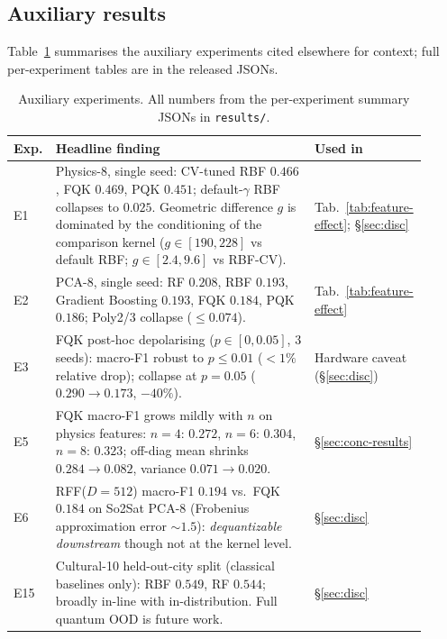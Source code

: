 \documentclass[pdflatex,sn-mathphys]{sn-jnl}
\theoremstyle{plain}
\theoremstyle{remark}
\theoremstyle{definition}
\begin{document}
\subsection{Auxiliary results}\label{sec:aux-results}\label{sec:rff}

Table~\ref{tab:aux} summarises the auxiliary experiments cited elsewhere for context; full per-experiment tables are in the released JSONs.

\begin{table}[htbp]
\caption{Auxiliary experiments.  All numbers from the per-experiment summary JSONs in \texttt{results/}.}
\label{tab:aux}
\begin{tabular}{p{0.08\linewidth}p{0.62\linewidth}p{0.21\linewidth}}
\toprule
Exp. & Headline finding & Used in \\
\midrule
E1  & Physics-8, single seed: CV-tuned RBF $0.466$, FQK $0.469$, PQK $0.451$; default-$\gamma$ RBF collapses to $0.025$.  Geometric difference $g$ is dominated by the conditioning of the comparison kernel ($g\in[190, 228]$ vs default RBF; $g\in[2.4, 9.6]$ vs RBF-CV). & Tab.~\ref{tab:feature-effect}; \S\ref{sec:disc} \\
E2  & PCA-8, single seed: RF $0.208$, RBF $0.193$, Gradient Boosting $0.193$, FQK $0.184$, PQK $0.186$; Poly2/3 collapse ($\le 0.074$). & Tab.~\ref{tab:feature-effect} \\
E3  & FQK post-hoc depolarising ($p\in[0,0.05]$, 3 seeds): macro-F1 robust to $p\le 0.01$ ($<\!1\%$ relative drop); collapse at $p=0.05$ ($0.290\to 0.173$, $-40\%$). & Hardware caveat (\S\ref{sec:disc}) \\
E5  & FQK macro-F1 grows mildly with $n$ on physics features: $n=4{:}\,0.272$, $n=6{:}\,0.304$, $n=8{:}\,0.323$; off-diag mean shrinks $0.284\to 0.082$, variance $0.071\to 0.020$. & \S\ref{sec:conc-results} \\
E6  & RFF($D=512$) macro-F1 $0.194$ vs.\ FQK $0.184$ on So2Sat PCA-8 (Frobenius approximation error $\sim\!1.5$): \emph{dequantizable downstream} though not at the kernel level. & \S\ref{sec:disc} \\
E15 & Cultural-10 held-out-city split (classical baselines only): RBF $0.549$, RF $0.544$; broadly in-line with in-distribution. Full quantum OOD is future work. & \S\ref{sec:disc} \\
\bottomrule
\end{tabular}
\end{table}

\end{document}

